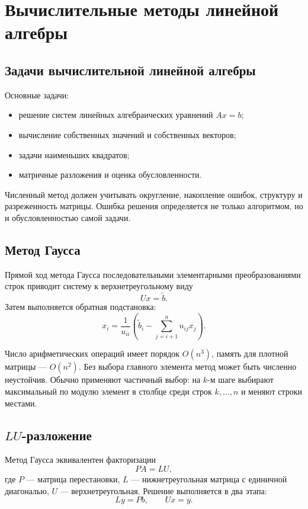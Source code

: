 \section{Вычислительные методы линейной алгебры}
\label{sec:numerical-linear-algebra}

\subsection{Задачи вычислительной линейной алгебры}

Основные задачи:
\begin{itemize}
    \item решение систем линейных алгебраических уравнений $Ax=b$;
    \item вычисление собственных значений и собственных векторов;
    \item задачи наименьших квадратов;
    \item матричные разложения и оценка обусловленности.
\end{itemize}

Численный метод должен учитывать округление, накопление ошибок, структуру и
разреженность матрицы. Ошибка решения определяется не только алгоритмом, но и
обусловленностью самой задачи.

\subsection{Метод Гаусса}

Прямой ход метода Гаусса последовательными элементарными преобразованиями строк
приводит систему к верхнетреугольному виду
\[
    Ux=\widetilde b.
\]
Затем выполняется обратная подстановка:
\[
    x_i=\frac{1}{u_{ii}}
    \left(\widetilde b_i-\sum_{j=i+1}^{n}u_{ij}x_j\right).
\]

Число арифметических операций имеет порядок $O(n^3)$, память для плотной матрицы
--- $O(n^2)$. Без выбора главного элемента метод может быть численно неустойчив.
Обычно применяют частичный выбор: на $k$-м шаге выбирают максимальный по модулю
элемент в столбце среди строк $k,\ldots,n$ и меняют строки местами.

\subsection[LU-разложение]{$LU$-разложение}

Метод Гаусса эквивалентен факторизации
\[
    PA=LU,
\]
где $P$ --- матрица перестановки, $L$ --- нижнетреугольная матрица с единичной
диагональю, $U$ --- верхнетреугольная. Решение выполняется в два этапа:
\[
    Ly=Pb,
    \qquad
    Ux=y.
\]

